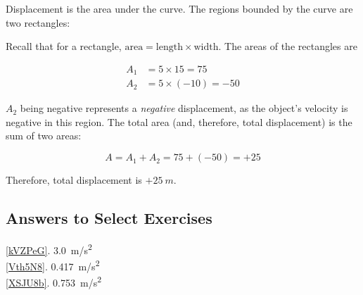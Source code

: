 \documentclass{article}
\numberwithin{equation}{section}
\numberwithin{figure}{section}
\begin{document}
\Solution Displacement is the area under the curve. The regions bounded by the curve are two rectangles:

\begin{center}
\end{center}

Recall that for a rectangle, $\text{area} = \text{length} \times \text{width}$. The areas of the rectangles are
\vspace{-1em}

\begin{align*}
    A_1 &= 5 \times 15 = 75\\[1ex]
    A_2 &= 5 \times (-10) = -50
\end{align*}

$A_2$ being negative represents a \textit{negative} displacement, as the object's velocity is negative in this region. The total area (and, therefore, total displacement) is the sum of two areas:

\begin{equation*}
    A = A_1 + A_2 = 75 + (-50) = +25
\end{equation*}

Therefore, total displacement is $+\SI{25}{m}$.

\vspace{2ex}

\cyanhrule


\subsection{Answers to Select Exercises}

\ref{kVZPeG}. \SI{3.0}{m/s^2}\\
\ref{Vth5N8}. \SI{0.417}{m/s^2}\\
\ref{XSJU8b}. \SI{0.753}{m/s^2}\\
\end{document}
